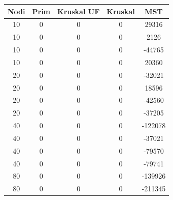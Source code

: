 \documentclass[a4paper]{article}
\begin{document}
\begin{table}[]
\begin{minipage}[b]{10cm}
\begin{tabular}{|c|c|c|c|c|}
\rowcolor{gray!50}
\hline
\textbf{Nodi} & \textbf{Prim} & \textbf{Kruskal UF} & \textbf{Kruskal} & \textbf{MST} \\ \hline
10            & 0              & 0                   & 0                & 29316        \\ \hline
10            & 0              & 0                   & 0                & 2126         \\ \hline
10            & 0              & 0                   & 0                & -44765       \\ \hline
10            & 0              & 0                   & 0                & 20360        \\ \hline
20            & 0              & 0                   & 0                & -32021       \\ \hline
20            & 0              & 0                   & 0                & 18596        \\ \hline
20            & 0              & 0                   & 0                & -42560       \\ \hline
20            & 0              & 0                   & 0                & -37205       \\ \hline
40            & 0              & 0                   & 0                & -122078      \\ \hline
40            & 0              & 0                   & 0                & -37021       \\ \hline
40            & 0              & 0                   & 0                & -79570       \\ \hline
40            & 0              & 0                   & 0                & -79741       \\ \hline
80            & 0              & 0                   & 0                & -139926      \\ \hline
80            & 0              & 0                   & 0                & -211345      \\ \hline

\end{tabular}
\end{minipage}
\end{table}
\end{document}
